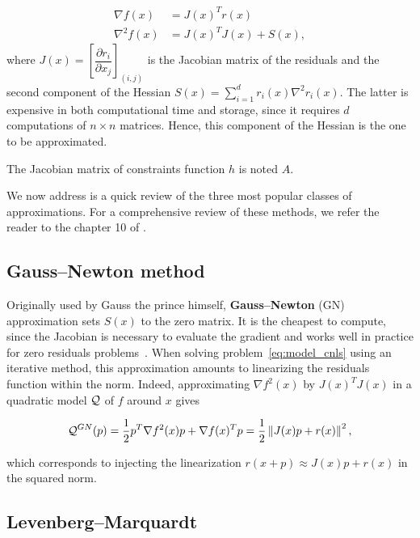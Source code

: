 \documentclass[10pt]{article}
\numberwithin{equation}{section}
\begin{document}
	 \begin{subequations}
	 		\begin{align}
	 		\nabla f(x) &= J(x)^Tr(x)\label{subeq:ls_grad} \\
	 		\nabla^2 f(x) &= J(x)^TJ(x) + S(x) , \label{subeq:ls_hessian}
	 		\end{align}
	 \end{subequations}
	 where $J(x) = \left[\dfrac{\partial r_i}{\partial x_j}\right]_{(i,j)}$ is the Jacobian matrix of the residuals and the second component of the Hessian $S(x) = \sum_{i=1}^{d} r_i(x) \nabla^2r_i(x) $. The latter is expensive in both computational time and storage, since it requires $d$ computations of $n\times n$ matrices. Hence, this component of the Hessian is the one to be approximated. 
	 
	 The Jacobian matrix of constraints function $h$ is noted $A$.
	 
	 
	 
	 We now address is a quick review of the three most popular classes of approximations. For a comprehensive review of these methods, we refer the reader to the chapter 10 of \cite{dennisschnabel:1996}.
	 
	 \subsection{Gauss--Newton method}
	 
	 Originally used by Gauss the prince himself, \textbf{Gauss--Newton} (GN) approximation sets $S(x)$ to the zero matrix. It is the cheapest to compute, since the Jacobian is necessary to evaluate the gradient and works well in practice for zero residuals problems~\cite{dennisschnabel:1996}. When solving problem~\eqref{eq:model_cnls} using an iterative method, this approximation amounts to linearizing the residuals function within the norm. Indeed, approximating $\nabla f^2(x)$ by $J(x)^TJ(x)$ in a quadratic model ${\mathcal{Q}}$ of $f$ around $x$ gives
	 
	 \begin{equation}\label{eq:gn_model}
	 	{\mathcal{Q}}^{GN} (p) = \dfrac{1}{2}p^T\nabla f^2(x)p + \nabla f(x)^Tp =  \dfrac{1}{2} \left\Vert J(x)p+r(x) \right\Vert^2,
	 \end{equation}
	 
	 which corresponds to injecting the linearization $r(x+p) \approx J(x)p+r(x)$ in the squared norm.
	 
	 \subsection{Levenberg--Marquardt}
	 
\end{document}
